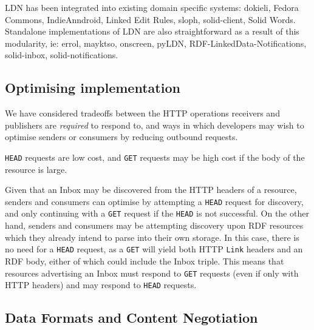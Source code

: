 \documentclass[a4paper]{llncs}
\begin{document}
\par LDN has been integrated into existing domain specific systems: dokieli, Fedora Commons, IndieAnndroid, Linked Edit Rules, sloph, solid-client, Solid Words. Standalone implementations of LDN are also straightforward as a result of this modularity, ie: errol, mayktso, onscreen, pyLDN, RDF-LinkedData-Notifications, solid-inbox, solid-notifications.




                                \subsection{Optimising implementation}
  \label{optimising-implementation}



\par We have considered tradeoffs between the HTTP operations receivers and publishers are {\em required} to respond to, and ways in which developers may wish to optimise senders or consumers by reducing outbound requests.


\par

                                        {\tt HEAD} requests are low cost, and {\tt GET} requests may be high cost if the body of the resource is large.

                                        Given that an Inbox may be discovered from the HTTP headers of a resource, senders and consumers can optimise by attempting a {\tt HEAD} request for discovery, and only continuing with a {\tt GET} request if the {\tt HEAD} is not successful. On the other hand, senders and consumers may be attempting discovery upon RDF resources which they already intend to parse into their own storage. In this case, there is no need for a {\tt HEAD} request, as a {\tt GET} will yield both HTTP {\tt Link} headers and an RDF body, either of which could include the Inbox triple. This means that resources advertising an Inbox must respond to {\tt GET} requests (even if only with HTTP headers) and may respond to {\tt HEAD} requests.





                                \subsection{Data Formats and Content Negotiation}
  \label{data-formats}
\end{document}
